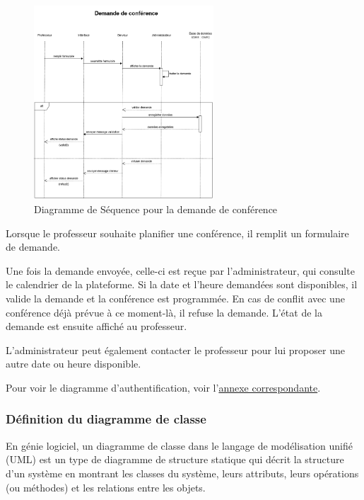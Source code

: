 \documentclass{article}
\begin{document}
\begin{figure}[H]
  \centering
  \includegraphics[width=0.6\textwidth]{demandesession(1.1).drawio.png}
  \caption{Diagramme de Séquence pour la demande de conférence}
  \end{figure}

\noindent Lorsque le professeur souhaite planifier une conférence, il remplit un formulaire de demande.

\vspace{0,3cm}

\noindent Une fois la demande envoyée, celle-ci est reçue par l’administrateur, qui consulte le calendrier de la plateforme. Si la date et l’heure demandées sont disponibles, il valide la demande et la conférence est programmée. En cas de conflit avec une conférence déjà prévue à ce moment-là, il refuse la demande. L’état de la demande est ensuite affiché au professeur.

\noindent L’administrateur peut également contacter le professeur pour lui proposer une autre date ou heure disponible.

\vspace{0,5cm}

\noindent Pour voir le diagramme d'authentification, voir l’\hyperref[annexe-auth]{annexe correspondante}.
\subsubsection{Définition du diagramme de classe}

\hspace*{2em} En génie logiciel, un diagramme de classe dans le langage de modélisation unifié (UML) est un type de diagramme de structure statique qui décrit la structure d'un système en montrant les classes du système, leurs attributs, leurs opérations (ou méthodes) et les relations entre les objets. \cite{classe}
\end{document}
